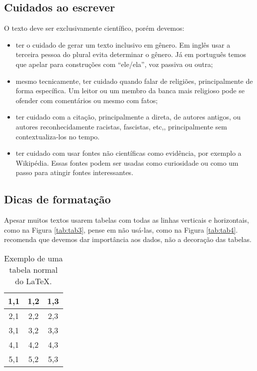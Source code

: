 \documentclass{article}
\begin{document}
\begin{itemize}
\subsection{Cuidados ao escrever}

O texto deve ser exclusivamente científico, porém devemos:
\begin{itemize}
    \item ter o cuidado de gerar um texto inclusivo em gênero. Em inglês usar a terceira pessoa do plural evita determinar o gênero. Já em português temos que apelar para construções com ``ele/ela'', voz passiva ou outra;
    \item mesmo tecnicamente, ter cuidado quando falar de religiões, principalmente de forma específica. Um leitor ou um membro da banca mais religioso pode se ofender com comentários ou mesmo com fatos;
    \item ter cuidado com a citação, principalmente a direta, de autores antigos, ou autores reconhecidamente racistas, fascistas, etc,, principalmente sem contextualiza-los no tempo.
    \item ter cuidado com usar fontes não científicas como evidência, por exemplo a Wikipédia. Essas fontes podem ser usadas como curiosidade ou como um passo para atingir fontes interessantes. 
\end{itemize}


\subsection{Dicas de formatação}

Apesar muitos textos usarem tabelas com todas as linhas verticais e horizontais, como na Figura \ref{tab:tab3}, pense em não usá-las, como na Figura \ref{tab:tab4}. \citeauthor{ei} recomenda que devemos dar importância aos dados, não a decoração das tabelas.


\begin{table}[htb]
    \centering
        \caption{Exemplo de uma tabela normal do \LaTeX .}
    \begin{tabular}{|c|c|c|}
    \hline
        1,1 & 1,2 & 1,3   \\
        \hline
        2,1 & 2,2 & 2,3\\
        \hline
        3,1 & 3,2 & 3,3\\
        \hline
        4,1 & 4,2 & 4,3\\
        \hline
        5,1 & 5,2 & 5,3\\
        \hline
    \end{tabular}


\end{table}
\end{itemize}
\end{document}
